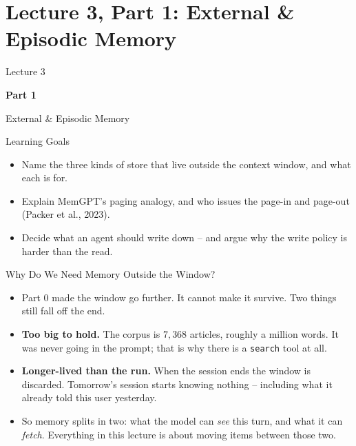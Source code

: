 \section{Lecture 3, Part 1: External \& Episodic Memory}

\begin{frame}
\vfill
\centering
{\color{RLBlue}\large Lecture 3}

\vspace{0.3em}
{\color{RLBlue}\Large\bfseries Part 1}

\vspace{0.6em}
{\Large External \& Episodic Memory}
\vfill
\end{frame}

\begin{frame}{Learning Goals}
\begin{itemize}
  \item Name the three kinds of store that live outside the context window, and what each is for.
  \pause
  \item Explain MemGPT's paging analogy, and who issues the page-in and page-out (Packer et al., 2023).
  \pause
  \item Decide what an agent should write down -- and argue why the write policy is harder than the read.
\end{itemize}
\end{frame}

\begin{frame}{Why Do We Need Memory Outside the Window?}
\begin{itemize}
  \item Part 0 made the window go further. It cannot make it survive. Two things still fall off the end.
  \pause
  \item \textbf{Too big to hold.} The corpus is $7{,}368$ articles, roughly a million words. It was never going in the prompt; that is why there is a \texttt{search} tool at all.
  \pause
  \item \textbf{Longer-lived than the run.} When the session ends the window is discarded. Tomorrow's session starts knowing nothing -- including what it already told this user yesterday.
  \pause
  \item So memory splits in two: what the model can \emph{see} this turn, and what it can \emph{fetch}. Everything in this lecture is about moving items between those two.
\end{itemize}
\end{frame}

